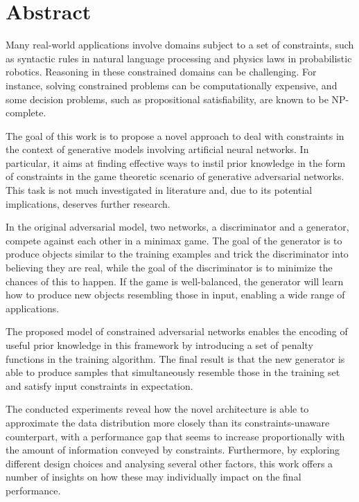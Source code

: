 \chapter*{Abstract} %


Many real-world applications involve domains subject to a set of constraints, such as syntactic rules in natural language processing and physics laws in probabilistic robotics. Reasoning in these constrained domains can be challenging. For instance, solving constrained problems can be computationally expensive, and some decision problems, such as propositional satisfiability, are known to be NP-complete.

The goal of this work is to propose a novel approach to deal with constraints in the context of generative models involving artificial neural networks. In particular, it aims at finding effective ways to instil prior knowledge in the form of constraints in the game theoretic scenario of generative adversarial networks. This task is not much investigated in literature and, due to its potential implications, deserves further research.

In the original adversarial model, two networks, a discriminator and a generator, compete against each other in a minimax game. The goal of the generator is to produce objects similar to the training examples and trick the discriminator into believing they are real, while the goal of the discriminator is to minimize the chances of this to happen. If the game is well-balanced, the generator will learn how to produce new objects resembling those in input, enabling a wide range of applications.

The proposed model of constrained adversarial networks enables the encoding of useful prior knowledge in this framework by introducing a set of penalty functions in the training algorithm. The final result is that the new generator is able to produce samples that simultaneously resemble those in the training set and satisfy input constraints in expectation.

The conducted experiments reveal how the novel architecture is able to approximate the data distribution more closely than its constraints-unaware counterpart, with a performance gap that seems to increase proportionally with the amount of information conveyed by constraints. Furthermore, by exploring different design choices and analysing several other factors, this work offers a number of insights on how these may individually impact on the final performance.

